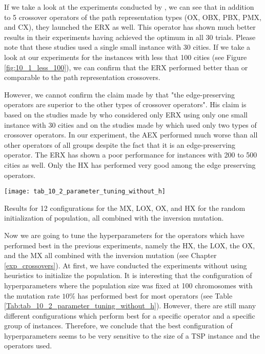 If we take a look at the experiments conducted by \citeauthor{starkweather1991comparison} \cite{starkweather1991comparison}, we can see that in addition to 5 crossover operators of the path representation types (OX, OBX, PBX, PMX, and CX), they launched the ERX as well. This operator has shown much better results in their experiments having achieved the optimum in all 30 trials. Please note that these studies used a single small instance with 30 cities. If we take a look at our experiments for the instances with less that 100 cities (see Figure \ref{fig:10_1_less_100}), we can confirm that the ERX performed better than or comparable to the path representation crossovers.\par 

However, we cannot confirm the claim made by \citeauthor{potvin1996genetic} \cite{potvin1996genetic} that "the edge-preserving operators are superior to the other types of crossover operators". His claim is based on the studies made by \citeauthor{starkweather1991comparison} \cite{starkweather1991comparison} who considered only ERX using only one small instance with 30 cities and on the studies made by \citeauthor{liepins1990genetic} \cite{liepins1990genetic} which used only two types of crossover operators. In our experiment, the AEX performed much worse than all other operators of all groups despite the fact that it is an edge-preserving operator. The ERX has shown a poor performance for instances with 200 to 500 cities as well. Only the HX has performed very good among the edge preserving operators.\par 

\begin{table}[htp] \centering
	\texttt{[image: tab\_10\_2\_parameter\_tuning\_without\_h]}
	\caption{Results for 12 configurations for the MX, LOX, OX, and HX for the random initialization of population, all combined with the inversion mutation.}
	\label{Tab:tab_10_2_parameter_tuning_without_h}
\end{table}	

Now we are going to tune the hyperparameters for the operators which have performed best in the previous experiments, namely the HX, the LOX, the OX, and the MX all combined with the inversion mutation (see Chapter \ref{exp_crossovers}). At first, we have conducted the experiments without using heuristics to initialize the population. It is interesting that the configuration of hyperparameters where the population size was fixed at 100 chromosomes with the mutation rate $10\%$ has performed best for most operators (see Table \ref{Tab:tab_10_2_parameter_tuning_without_h}). However, there are still many different configurations which perform best for a specific operator and  a specific group of instances. Therefore, we conclude that the best configuration of hyperparameters seems to be very sensitive to the size of a TSP instance and the operators used.\par 


